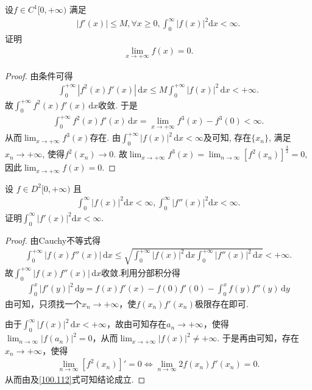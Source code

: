 \documentclass[../../main.tex]{subfiles}%
\begin{document}
\begin{example}
设$f \in C^1[0, +\infty)$ 满足
\begin{align*}
|f'(x)| \leqslant M, \forall x \geqslant 0, \int_0^{\infty} |f(x)|^2 \mathrm{d}x < \infty.
\end{align*}
证明
\begin{align*}
\lim_{x \to +\infty} f(x) = 0.
\end{align*}
\end{example}
\begin{proof}
由条件可得
\begin{align*}
\int_0^{+\infty} \left| f^2(x) f'(x) \right| \, \mathrm{d}x \leqslant M \int_0^{+\infty} \left| f(x) \right|^2 \, \mathrm{d}x < +\infty.
\end{align*}
故$\int_0^{+\infty} f^2(x) f'(x) \, \mathrm{d}x$收敛. 于是
\begin{align*}
\int_0^{+\infty} f^2(x) f'(x) \, \mathrm{d}x = \lim_{x \to +\infty} f^3(x) - f^3(0) < \infty.
\end{align*}
从而$\lim_{x \to +\infty} f^3(x)$存在. 由$\int_0^{+\infty} \left| f(x) \right|^2 \, \mathrm{d}x < \infty$及可知, 存在$\{x_n\}$, 满足$x_n \to +\infty$, 使得$f^2(x_n) \to 0$.
故$\lim_{x\rightarrow +\infty} f^3(x)=\lim_{n\rightarrow \infty} \left[ f^2(x_n) \right] ^{\frac{3}{2}}=0$, 因此$\lim_{x \to +\infty} f(x) = 0$.
\end{proof}

\begin{example}
设 $f \in D^2[0, +\infty)$ 且
\begin{align*}
\int_0^{\infty} |f(x)|^2 \mathrm{d}x < \infty, \int_0^{\infty} |f''(x)|^2 \mathrm{d}x < \infty.
\end{align*}
证明$\int_0^{\infty} |f'(x)|^2 \mathrm{d}x < \infty$.
\end{example}
\begin{proof}
由Cauchy不等式得
\begin{align*}
\int_0^{+\infty}|f(x)f''(x)|\,\mathrm{d}x\leqslant\sqrt{\int_0^{+\infty}|f(x)|^2\,\mathrm{d}x\int_0^{+\infty}|f''(x)|^2\,\mathrm{d}x}<+\infty.
\end{align*}
故$\int_0^{+\infty}|f(x)f''(x)|\,\mathrm{d}x$收敛.利用分部积分得
\begin{align}\label{100.112}
\int_0^x|f'(y)|^2\,\mathrm{d}y=f(x)f'(x)-f(0)f'(0)-\int_0^x f(y)f''(y)\,\mathrm{d}y
\end{align}
由可知，只须找一个$x_n\rightarrow+\infty$，使$f(x_n)f'(x_n)$极限存在即可.

由于$\int_0^{\infty}|f(x)|^2\,\mathrm{d}x<+\infty$，故由可知存在$a_n\rightarrow+\infty$，使得$\lim_{n\rightarrow\infty}|f(a_n)|^2=0$，从而$\lim_{x\rightarrow+\infty}|f(x)|^2\ne+\infty$.
于是再由可知，存在$x_n\rightarrow+\infty$，使得
\begin{align*}
\lim_{n\rightarrow\infty}[f^2(x_n)]'=0\Longleftrightarrow\lim_{n\rightarrow\infty}2f(x_n)f'(x_n)=0.
\end{align*}
从而由及\eqref{100.112}式可知结论成立.
\end{proof}
\end{document}

